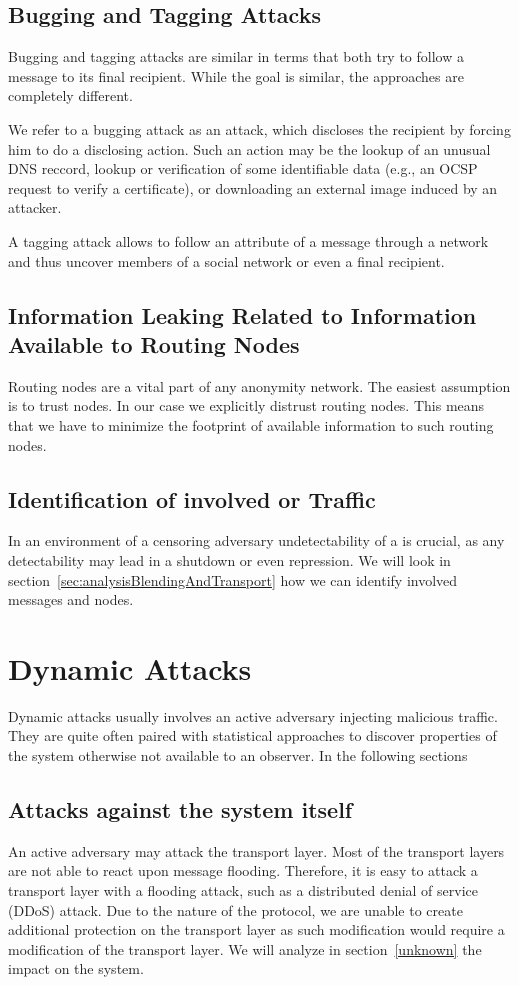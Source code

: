 \subsection{Bugging and Tagging Attacks}
Bugging and tagging attacks are similar in terms that both try to follow a message to its final recipient. While the goal is similar, the approaches are completely different.

We refer to a bugging attack as an attack, which discloses the recipient by forcing him to do a disclosing action. Such an action may be the lookup of an unusual DNS reccord, lookup or verification of some identifiable data (e.g., an OCSP request to verify a certificate), or downloading an external image induced by an attacker.

A tagging attack allows to follow an attribute of a message through a network and thus uncover members of a social network or even a final recipient.

\subsection{Information Leaking Related to Information Available to Routing Nodes}
Routing nodes are a vital part of any anonymity network. The easiest assumption is to trust nodes. In our case we explicitly distrust routing nodes. This means that we have to minimize the footprint of available information to such routing nodes.

\subsection{Identification of involved \VortexNodes{} or \MessageVortex{} Traffic}
In an environment of a censoring adversary undetectability of a \VortexNode{} is crucial, as any detectability may lead in a shutdown or even repression. We will look in section~\ref{sec:analysisBlendingAndTransport} how we can identify involved messages and nodes.

\section{Dynamic Attacks}
Dynamic attacks usually involves an active adversary injecting malicious traffic. They are quite often paired with statistical approaches to discover properties of the system otherwise not available to an observer. In the following sections 

\subsection{Attacks against the \MessageVortex{} system itself}
An active adversary may attack the transport layer. Most of the transport layers are not able to react upon message flooding. Therefore, it is easy to attack a transport layer with a flooding attack, such as a distributed denial of service (DDoS) attack. Due to the nature of the protocol, we are unable to create additional protection on the transport layer as such modification would require a modification of the transport layer. We will analyze in section~\ref{unknown} the impact on the \MessageVortex{} system.

